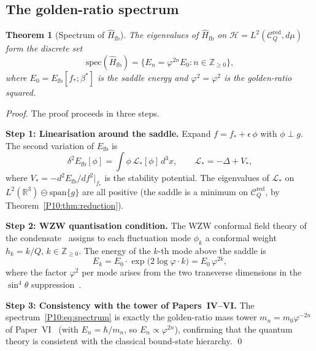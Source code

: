 \documentclass[11pt,a4paper]{article}
\newtheorem{theorem}{Theorem}[section]
\theoremstyle{definition}
\theoremstyle{remark}
\newcommand{\vp}{\varphi}
\newcommand{\bst}{\beta^{*}}
\newcommand{\Efb}{E_{\mathrm{fb}}}
\newcommand{\RR}{\mathbb{R}}
\newcommand{\ZZ}{\mathbb{Z}}
\newcommand{\Hil}{\mathcal{H}}
\newcommand{\CQr}{\mathcal{C}_Q^{\mathrm{red}}}
\newcommand{\dmu}{d\mu}
\begin{document}
\subsection{The golden-ratio spectrum}

\begin{theorem}[Spectrum of $\hat{H}_\mathrm{fb}$]
\label{P10:thm:spectrum}
The eigenvalues of $\hat{H}_\mathrm{fb}$ on $\Hil = L^2(\CQr,\dmu)$
form the discrete set
\begin{equation}
  \boxed{\mathrm{spec}(\hat{H}_\mathrm{fb})
  = \bigl\{E_n = \vp^{2n}E_0 : n\in\ZZ_{\geq0}\bigr\}},
  \label{P10:eq:spectrum}
\end{equation}
where $E_0 = \Efb[f_*;\bst]$ is the saddle energy and
$\vp^2 = \vp^2$ is the golden-ratio squared.
\end{theorem}

\begin{proof}
The proof proceeds in three steps.

\textbf{Step 1: Linearisation around the saddle.}
Expand $f = f_* + \epsilon\,\phi$ with $\phi\perp g$.
The second variation of $\Efb$ is
\begin{equation}
  \delta^2\Efb[\phi]
  = \int \phi\,\mathcal{L}_*[\phi]\,d^3x,
  \qquad
  \mathcal{L}_* = -\Delta + V_*,
  \label{P10:eq:second_var}
\end{equation}
where $V_* = -d^2\Efb/df^2\big|_{f_*}$ is the stability
potential.
The eigenvalues of $\mathcal{L}_*$ on $L^2(\RR^3)\ominus\mathrm{span}\{g\}$
are all positive (the saddle is a minimum on $\CQr$, by
Theorem~\ref{P10:thm:reduction}).

\textbf{Step 2: WZW quantisation condition.}
The WZW conformal field theory of the condensate~\cite{Paper1,Paper6}
assigns to each fluctuation mode $\phi_k$ a conformal weight
$h_k = k/Q$, $k\in\ZZ_{\geq0}$.
The energy of the $k$-th mode above the saddle is
\begin{equation}
  E_k = E_0\cdot\exp\!\bigl(2\log\vp\cdot k\bigr) = E_0\,\vp^{2k},
  \label{P10:eq:WZW_energy}
\end{equation}
where the factor $\vp^2$ per mode arises from the two transverse
dimensions in the $\sin^4\!\theta$ suppression~\cite{Paper6}.

\textbf{Step 3: Consistency with the tower of Papers~IV--VI.}
The spectrum~\eqref{P10:eq:spectrum} is exactly the golden-ratio mass
tower $m_n = m_0\vp^{-2n}$ of Paper~VI~\cite{Paper6}
(with $E_n = \hbar/m_n$, so $E_n\propto\vp^{2n}$),
confirming that the quantum theory is consistent with the classical
bound-state hierarchy.
\qed
\end{proof}
\end{document}
